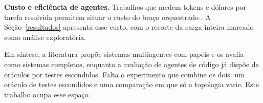 \textbf{Custo e eficiência de agentes.} Trabalhos que medem tokens e dólares por tarefa resolvida permitem situar o custo do braço orquestrado \citep{Kapoor2025AgentsThatMatter, Kapoor2026HAL}. A Seção~\ref{resultados} apresenta esse custo, com o recorte da carga inteira marcado como análise exploratória.

Em síntese, a literatura propõe sistemas multiagentes com papéis e os avalia como sistemas completos, enquanto a avaliação de agentes de código já dispõe de oráculos por testes escondidos. Falta o experimento que combine os dois: um oráculo de testes escondidos e uma comparação em que só a topologia varie. Este trabalho ocupa esse espaço.
